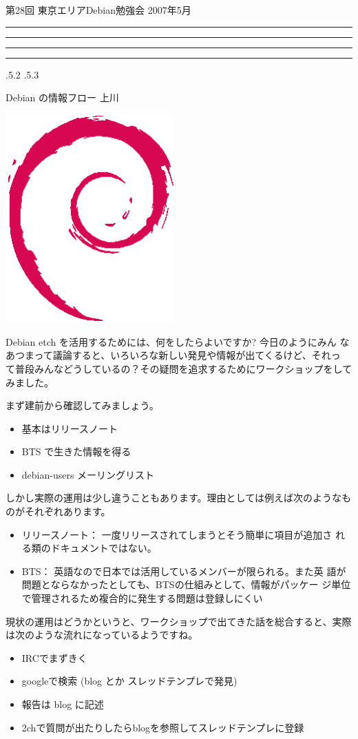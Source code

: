 \documentclass[mingoth,a4paper]{jsarticle}
\makeatletter
\newcommand{\debmtgyear}{2007}
\newcommand{\debmtgmonth}{5}
\newcommand{\debmtgnumber}{28}
\renewcommand{\section}{\@startsection{section}{1}{\z@}%
    {\Cvs \@plus.5\Cdp \@minus.2\Cdp}%
    {.5\Cvs \@plus.3\Cdp}%
    {\normalfont\gt\fontsize{26}{26}\headfont\raggedright}} %
\newcommand{\dancersection}[2]{%
\newpage
第\debmtgnumber{}回 東京エリアDebian勉強会 \debmtgyear{}年\debmtgmonth{}月
\hrule
\vspace{0.5mm}
\hrule
%
\vspace{4cm}
\hrule
\vspace{0.5mm}
\hrule
%
\vspace{-7cm}
\begin{minipage}[b]{0.7\hsize}
\section{#1}
\hfill{}#2\\
\vspace{2cm}
\end{minipage}
\begin{minipage}[b]{0.3\hsize}
\hfill{}\includegraphics[height=8cm]{image200502/openlogo-nd.eps}\\
\end{minipage}
%
\vspace{-1cm}
}
\makeatother
\begin{document}
\dancersection{Debian の情報フロー}{上川}
\label{debianinfo}

\begin{minipage}{0.6\hsize}
 Debian etch を活用するためには、何をしたらよいですか?  今日のようにみん
 なあつまって議論すると、いろいろな新しい発見や情報が出てくるけど、それっ
 て普段みんなどうしているの？その疑問を追求するためにワークショップをして
 みました。

 まず建前から確認してみましょう。

 \begin{itemize}
  \item 基本はリリースノート
  \item BTS で生きた情報を得る
  \item debian-users メーリングリスト
 \end{itemize}

しかし実際の運用は少し違うこともあります。理由としては例えば次のようなも
 のがそれぞれあります。

\begin{itemize}
 \item リリースノート： 一度リリースされてしまうとそう簡単に項目が追加さ
       れる類のドキュメントではない。
 \item BTS： 英語なので日本では活用しているメンバーが限られる。また英
       語が問題とならなかったとしても、BTSの仕組みとして、情報がパッケー 
       ジ単位で管理されるため複合的に発生する問題は登録しにくい
\end{itemize}

現状の運用はどうかというと、ワークショップで出てきた話を総合すると、実際
は次のような流れになっているようですね。

 \begin{itemize}
  \item IRCでまずきく
  \item googleで検索 (blog とか スレッドテンプレで発見)
  \item 報告は blog に記述
  \item 2chで質問が出たりしたらblogを参照してスレッドテンプレに登録
 \end{itemize}
\end{minipage}
\end{document}
